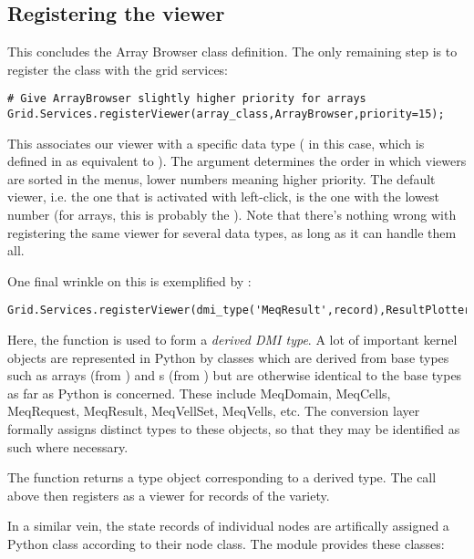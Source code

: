 \documentclass[12pt,twoside]{book}
\begin{document}
\subsection{Registering the viewer} 

  This concludes the Array Browser class definition. The only remaining step is
  to register the class with the grid services:

\begin{verbatim}  
# Give ArrayBrowser slightly higher priority for arrays
Grid.Services.registerViewer(array_class,ArrayBrowser,priority=15);
\end{verbatim}

  This associates our viewer with a specific data type ( in
  this case, which is defined in  as equivalent to
  ). The  argument determines the order in which
  viewers are sorted in the menus, lower numbers meaning higher priority. The
  default viewer, i.e. the one that is activated with left-click, is the one
  with the lowest number (for arrays, this is probably the ).
  Note that there's nothing wrong with registering the same viewer for several
  data types, as long as it can handle them all. 

  One final wrinkle on this is exemplified by :
  
\begin{verbatim}  
Grid.Services.registerViewer(dmi_type('MeqResult',record),ResultPlotter,priority=10)
\end{verbatim}

  Here, the  function is used  to form a {\em derived
  DMI type}. A lot of important kernel objects are represented in Python by
  classes which are derived from base types such as arrays (from )
  and s (from ) but are otherwise identical to the base
  types as far as Python is concerned. These include MeqDomain, MeqCells,
  MeqRequest, MeqResult, MeqVellSet, MeqVells, etc. The conversion layer
  formally assigns distinct types to these objects, so that they may be
  identified as such where necessary. 

  The  function returns a type object corresponding to a derived
  type. The call above then registers  as a viewer for records
  of the  variety.

  In a similar vein, the state records of individual nodes are artifically
  assigned a Python class according to their node class. The 
  module provides these classes:
  
\end{document}
